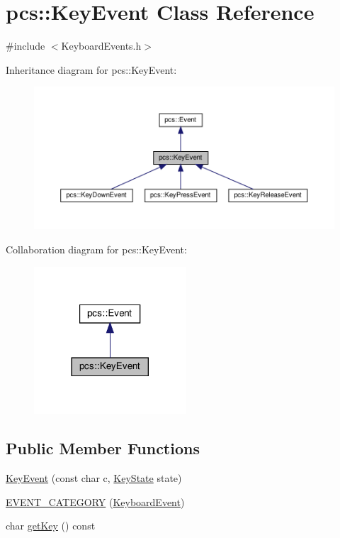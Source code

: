 \hypertarget{classpcs_1_1KeyEvent}{}\section{pcs\+:\+:Key\+Event Class Reference}
\label{classpcs_1_1KeyEvent}


{\ttfamily \#include $<$Keyboard\+Events.\+h$>$}



Inheritance diagram for pcs\+:\+:Key\+Event\+:\nopagebreak
\begin{figure}[H]
\begin{center}
\leavevmode
\includegraphics[width=350pt]{classpcs_1_1KeyEvent__inherit__graph}
\end{center}
\end{figure}


Collaboration diagram for pcs\+:\+:Key\+Event\+:\nopagebreak
\begin{figure}[H]
\begin{center}
\leavevmode
\includegraphics[width=161pt]{classpcs_1_1KeyEvent__coll__graph}
\end{center}
\end{figure}
\subsection*{Public Member Functions}
\begin{DoxyCompactItemize}
\item 
\hyperlink{classpcs_1_1KeyEvent_a238360a5576281a9d19a986a05cfd118}{Key\+Event} (const char c, \hyperlink{namespacepcs_a74212420ef246b051e11d561089ed547}{Key\+State} state)
\item 
\hyperlink{classpcs_1_1KeyEvent_a6b971ff54d31d691f6e5632a9863ba9b}{E\+V\+E\+N\+T\+\_\+\+C\+A\+T\+E\+G\+O\+RY} (\hyperlink{namespacepcs_a3538ef524602fc09ddb40acc72480c60a26cd4d5fcc5bb943efa4fd4ce0a69386}{Keyboard\+Event})
\item 
char \hyperlink{classpcs_1_1KeyEvent_ad1b80fa4d8b88aeb339973e27f1971dc}{get\+Key} () const
\end{DoxyCompactItemize}

